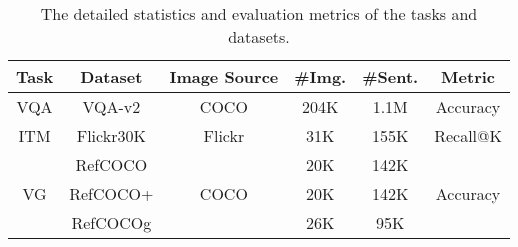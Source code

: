 \documentclass[sigconf]{acmart}
\begin{document}
\begin{table}
\centering
\footnotesize
\caption{The detailed statistics and evaluation metrics of the tasks and datasets.}\label{table:dts}
 \vspace{-5pt}
\begin{tabular}{c|c|cccc}
\toprule
Task &Dataset& Image Source& \#Img. & \#Sent. & Metric\\
\midrule
{VQA} &VQA-v2 \cite{goyal2016making}& COCO & 204K &1.1M & {Accuracy}\\
\midrule
ITM & Flickr30K \cite{plummer2015flickr30k}& Flickr & 31K & 155K & Recall@K\\
\midrule
\multirow{3}{*}{VG} & RefCOCO \cite{kazemzadeh2014referitgame} & \multirow{3}{*}{COCO} & 20K & 142K & \multirow{3}{*}{Accuracy}\\
& RefCOCO+ \cite{kazemzadeh2014referitgame}&&20K & 142K & \\
& RefCOCOg \cite{mao2016generation}&&26K & 95K & \\
\bottomrule
\end{tabular}
\vspace{-5pt}
\end{table}
\end{document}
